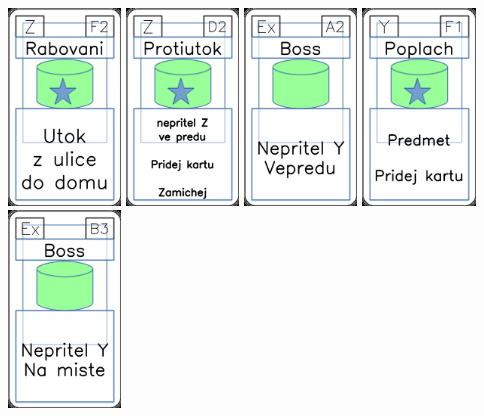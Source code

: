\documentclass[a4paper]{article}
\begin{document}
	\includegraphics[width=3.0cm]{img-5_56}
	\includegraphics[width=3.0cm]{img-5_46}
	\includegraphics[width=3.0cm]{img-4_1}
	\includegraphics[width=3.0cm]{img-5_25}
	\includegraphics[width=3.0cm]{img-4_7}
\end{document}
